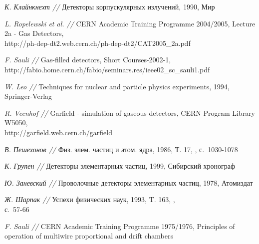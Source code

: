 \documentclass[a4paper,12pt,titlepage]{article}
\begin{document}
\begin{thebibliography}{99}
  \emph{К. Клайнкнехт //} Детекторы корпускулярных излучений, 1990, Мир

  \emph{L. Ropelewski et al. //} CERN Academic Training Programme 2004/2005,
  Lecture 2a - Gas Detectors, \\
  http://ph-dep-dt2.web.cern.ch/ph-dep-dt2/CAT2005\_2a.pdf

  \emph{F. Sauli //} Gas-filled detectors, Short Courses-2002-1,\\
  http://fabio.home.cern.ch/fabio/seminars.res/ieee02\_sc\_sauli1.pdf
    
  \emph{W. Leo //} Techniques for nuclear and particle physics experiments,
  1994, Springer-Verlag

  \emph{R. Veenhof //} Garfield - simulation of gaseous detectors,
  CERN Program Library W5050, \\ http://garfield.web.cern.ch/garfield

  \emph{В. Пешехонов //} Физ. элем. частиц и атом. ядра, 1986, Т. 17,
  , с.~1030-1078

  \emph{К. Групен //} Детекторы элементарных частиц, 1999, Сибирский
  хронограф

  \emph{Ю. Заневский //} Проволочные детекторы элементарных частиц,
  1978, Атомиздат

  \emph{Ж. Шарпак //} Успехи физических наук, 1993, T. 163, , \\
  с.~57-66

  \emph{F. Sauli //} CERN Academic Training Programme 1975/1976,
  Principles of operation of multiwire proportional and drift chambers
\end{thebibliography}
\end{document}
